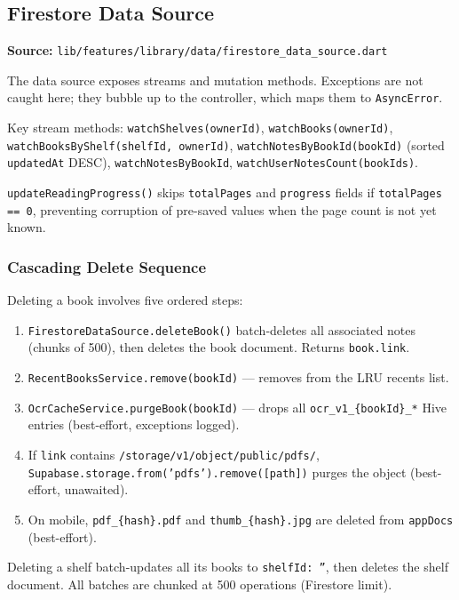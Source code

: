 \documentclass[11pt,a4paper]{article}
\begin{document}
\subsection{Firestore Data Source}

\textbf{Source:} \texttt{lib/features/library/data/firestore\_data\_source.dart}

The data source exposes streams and mutation methods. Exceptions are not caught here;
they bubble up to the controller, which maps them to \texttt{AsyncError}.

Key stream methods: \texttt{watchShelves(ownerId)},
\texttt{watchBooks(ownerId)}, \texttt{watchBooksByShelf(shelfId, ownerId)},
\texttt{watchNotesByBookId(bookId)} (sorted \texttt{updatedAt} DESC),
\texttt{watchNotesByBookId}, \texttt{watchUserNotesCount(bookIds)}.

\texttt{updateReadingProgress()} skips \texttt{totalPages} and \texttt{progress} fields
if \texttt{totalPages == 0}, preventing corruption of pre-saved values when the page
count is not yet known.

\subsubsection{Cascading Delete Sequence}

Deleting a book involves five ordered steps:

\begin{enumerate}
  \item \texttt{FirestoreDataSource.deleteBook()} batch-deletes all associated notes
    (chunks of 500), then deletes the book document. Returns \texttt{book.link}.
  \item \texttt{RecentBooksService.remove(bookId)} --- removes from the LRU recents list.
  \item \texttt{OcrCacheService.purgeBook(bookId)} --- drops all
    \texttt{ocr\_v1\_\{bookId\}\_*} Hive entries (best-effort, exceptions logged).
  \item If \texttt{link} contains \texttt{/storage/v1/object/public/pdfs/},
    \texttt{Supabase.storage.from('pdfs').remove([path])} purges the object
    (best-effort, unawaited).
  \item On mobile, \texttt{pdf\_\{hash\}.pdf} and \texttt{thumb\_\{hash\}.jpg} are
    deleted from \texttt{appDocs} (best-effort).
\end{enumerate}

Deleting a shelf batch-updates all its books to \texttt{shelfId: ''}, then deletes the
shelf document. All batches are chunked at 500 operations (Firestore limit).
\end{document}
